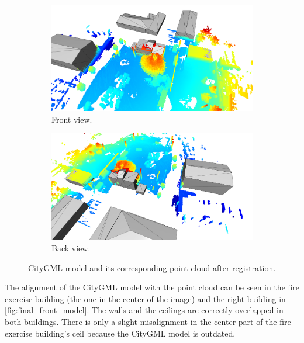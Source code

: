         \begin{figure}[H]
            \centering
            \begin{subfigure}{1\textwidth}
                \centering
                \includegraphics[scale=0.15]{images/solution_images/final_front.png}
                \caption{Front view.}
                \label{fig:final_front_model}
            \end{subfigure}
            \hfill
            \begin{subfigure}{1\textwidth}
                \centering
                \includegraphics[scale=0.15]{images/solution_images/final_back.png}
                \caption{Back view.}
                \label{fig:final_back_model}
            \end{subfigure}
            \caption{CityGML model and its corresponding point cloud after registration.}
            \label{fig:final_CityGML}
        \end{figure}
        
        The alignment of the CityGML model with the point cloud can be seen in the fire exercise building (the one in the center of the image)
        and the right building in \autoref{fig:final_front_model}. The walls and the ceilings are correctly overlapped in both buildings.
        There is only a slight misalignment in the center part of the fire exercise building’s ceil because the CityGML model is outdated.

